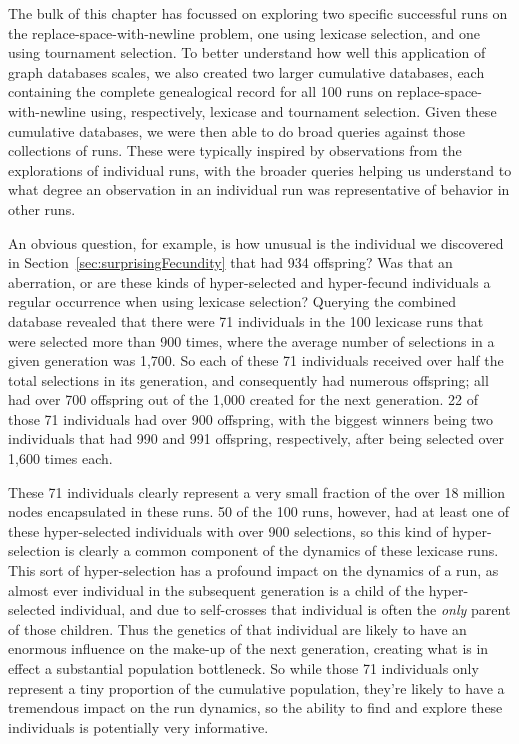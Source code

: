 The bulk of this chapter has focussed on exploring two specific successful runs on the replace-space-with-newline problem,
one using lexicase selection, and one using tournament selection. To better understand how well this application of graph
databases scales, we also created two larger cumulative databases, each containing the complete genealogical record for all 
100 runs on replace-space-with-newline using, respectively, lexicase and tournament selection. Given these cumulative 
databases, we were then able to do broad queries against those collections of runs. These were typically inspired by 
observations from the explorations of individual runs, with the broader queries helping us understand to what degree an 
observation in an individual run was representative of behavior in other runs.

An obvious question, for example, is how unusual is the individual we discovered in Section~\ref{sec:surprisingFecundity} 
that had 934 offspring? Was that an aberration, or are these kinds of hyper-selected and hyper-fecund individuals a
regular occurrence when using lexicase selection? Querying the combined database revealed that there were 71 individuals
in the 100 lexicase runs that were selected more than 900 times, where the average number of selections in a given 
generation was 1,700. So each of these 71 individuals received over half the total selections in its generation, and 
consequently had numerous offspring; all had over 700 offspring out of the 1,000 created for the next generation. 22 of
those 71 individuals had over 900 offspring, with the biggest winners being two individuals that had 990 and 991 
offspring, respectively, after being selected over 1,600 times each. 

These 71 individuals clearly represent a very small fraction of the over 18 million nodes encapsulated in these runs. 50 of
the 100 runs, however, had at least one of these hyper-selected individuals with over 900 selections, so this kind of 
hyper-selection is clearly a common component of the dynamics of these lexicase runs. This sort of hyper-selection 
has a profound impact on the dynamics of a run, as almost ever individual in the subsequent generation is a child of
the hyper-selected individual, and due to self-crosses that individual is often the \emph{only} parent of those children. Thus
the genetics of that individual are likely to have an enormous influence on the make-up of the next generation, creating
what is in effect a substantial population bottleneck. So while those 71 individuals only represent a tiny proportion of
the cumulative population, they're likely to have a tremendous impact on the run dynamics, so the ability to find and
explore these individuals is potentially very informative.

